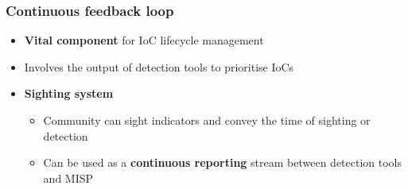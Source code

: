 \begin{frame}
\frametitle{Continuous feedback loop}
    \begin{itemize}
        \item {\bf Vital component} for IoC lifecycle management
        \item Involves the output of detection tools to prioritise IoCs
        \item {\bf Sighting system}
        \begin{itemize}
            \item Community can sight indicators and convey the time of sighting or detection
            \item Can be used as a {\bf continuous reporting} stream between detection tools and MISP
        \end{itemize}
    \end{itemize}
    
    \begin{center}
    \end{center}
\end{frame}

